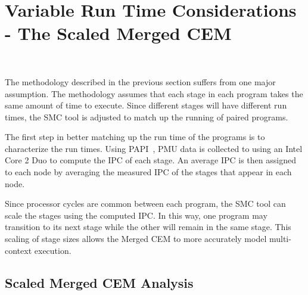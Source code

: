 

\section{Variable Run Time Considerations - The Scaled Merged CEM}~\label{sec:simmc_scaled}

The methodology described in the previous section suffers from one
major assumption. The methodology assumes that each stage in each
program takes the same amount of time to execute.
Since different stages will have different run times, the SMC tool is adjusted to match up the
running of paired programs.

The first step in better matching up the run time of the programs is to
characterize the run times. Using PAPI~\cite{papi}, PMU data is collected to
using an Intel Core 2 Duo to compute the IPC of each stage. An
average IPC is then assigned to each node by averaging the measured IPC of the
stages that appear in each node.

Since processor cycles are common between each program, the SMC tool can scale
the stages using the computed IPC. In this way, one program may transition to
its next stage while the other
will remain in the same stage. This scaling of stage sizes allows the Merged CEM
to more accurately model multi-context execution.

\subsection{Scaled Merged CEM Analysis}~\label{sec:simmc_scaled_analysis}

